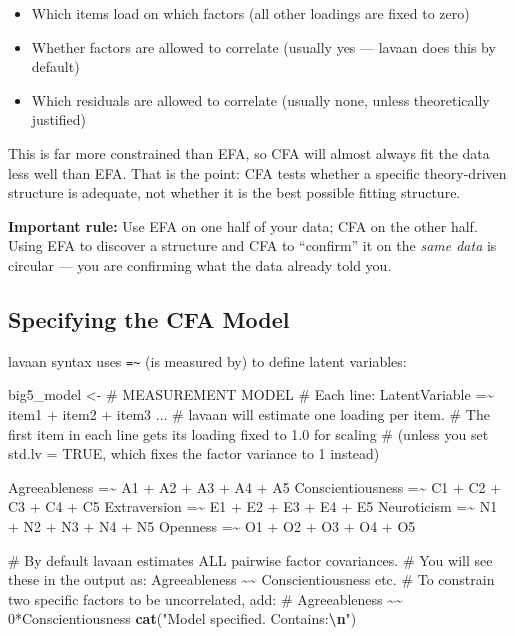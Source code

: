 \documentclass[
]{article}
\newenvironment{Shaded}{\begin{snugshade}}{\end{snugshade}}
\newcommand{\FunctionTok}[1]{\textcolor[rgb]{0.13,0.29,0.53}{\textbf{#1}}}
\newcommand{\NormalTok}[1]{#1}
\newcommand{\OtherTok}[1]{\textcolor[rgb]{0.56,0.35,0.01}{#1}}
\newcommand{\SpecialCharTok}[1]{\textcolor[rgb]{0.81,0.36,0.00}{\textbf{#1}}}
\newcommand{\StringTok}[1]{\textcolor[rgb]{0.31,0.60,0.02}{#1}}
\newcounter{none} %
\providecommand{\tightlist}{%
  \setlength{\itemsep}{0pt}\setlength{\parskip}{0pt}}
\begin{document}
\begin{itemize}
\tightlist
\item
  Which items load on which factors (all other loadings are fixed to
  zero)
\item
  Whether factors are allowed to correlate (usually yes --- lavaan does
  this by default)
\item
  Which residuals are allowed to correlate (usually none, unless
  theoretically justified)
\end{itemize}

This is far more constrained than EFA, so CFA will almost always fit the
data less well than EFA. That is the point: CFA tests whether a specific
theory-driven structure is adequate, not whether it is the best possible
fitting structure.

\textbf{Important rule:} Use EFA on one half of your data; CFA on the
other half. Using EFA to discover a structure and CFA to ``confirm'' it
on the \emph{same data} is circular --- you are confirming what the data
already told you.

\subsection{Specifying the CFA Model}\label{specifying-the-cfa-model}

lavaan syntax uses \texttt{=\textasciitilde{}} (is measured by) to
define latent variables:

\begin{Shaded}
\begin{Highlighting}[]
\NormalTok{big5\_model }\OtherTok{\textless{}{-}} \StringTok{\textquotesingle{}}
\StringTok{  \# MEASUREMENT MODEL}
\StringTok{  \# Each line: LatentVariable =\textasciitilde{} item1 + item2 + item3 ...}
\StringTok{  \# lavaan will estimate one loading per item.}
\StringTok{  \# The first item in each line gets its loading fixed to 1.0 for scaling}
\StringTok{  \# (unless you set std.lv = TRUE, which fixes the factor variance to 1 instead)}

\StringTok{  Agreeableness     =\textasciitilde{} A1 + A2 + A3 + A4 + A5}
\StringTok{  Conscientiousness =\textasciitilde{} C1 + C2 + C3 + C4 + C5}
\StringTok{  Extraversion      =\textasciitilde{} E1 + E2 + E3 + E4 + E5}
\StringTok{  Neuroticism       =\textasciitilde{} N1 + N2 + N3 + N4 + N5}
\StringTok{  Openness          =\textasciitilde{} O1 + O2 + O3 + O4 + O5}

\StringTok{  \# By default lavaan estimates ALL pairwise factor covariances.}
\StringTok{  \# You will see these in the output as: Agreeableness \textasciitilde{}\textasciitilde{} Conscientiousness etc.}
\StringTok{  \# To constrain two specific factors to be uncorrelated, add:}
\StringTok{  \# Agreeableness \textasciitilde{}\textasciitilde{} 0*Conscientiousness}
\StringTok{\textquotesingle{}}
\FunctionTok{cat}\NormalTok{(}\StringTok{"Model specified. Contains:}\SpecialCharTok{\textbackslash{}n}\StringTok{"}\NormalTok{)}
\end{Highlighting}
\end{Shaded}
\end{document}
